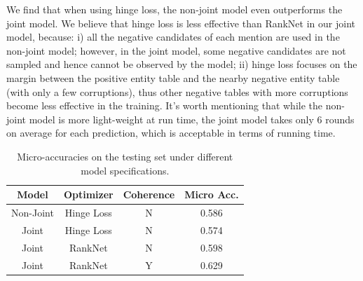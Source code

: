 We find that when using hinge loss, the non-joint model even 
outperforms the joint model.
We believe that hinge loss is less effective than RankNet in our joint model,
because: i) all the negative candidates of each mention are used in the 
non-joint model; however, in the joint model, 
some negative candidates are not sampled and hence cannot be observed by the model;
ii) hinge loss focuses on the margin between the positive entity table 
and the nearby negative entity table (with only a few corruptions),
thus other negative tables with more corruptions become less effective
in the training.
It's worth mentioning that while the non-joint model is more 
light-weight at run time, the joint model takes only 6 rounds on average
for each prediction, which is acceptable in terms of running time.

\begin{table}[ht]
	\small
    \centering
    \caption{Micro-accuracies on the testing set under different model specifications.}
    \label{tab:ablation-joint}
    \begin{tabular} {c|c|c|c}
        \hline
        Model       & Optimizer     & Coherence  &  Micro Acc.   \\
        \hline
        Non-Joint   & Hinge Loss    & N     & 0.586         \\
        Joint       & Hinge Loss    & N     & 0.574         \\
        Joint       & RankNet       & N     & 0.598         \\
        Joint       & RankNet       & Y     & 0.629         \\
        \hline
    \end{tabular}
\end{table}



%
%
%

